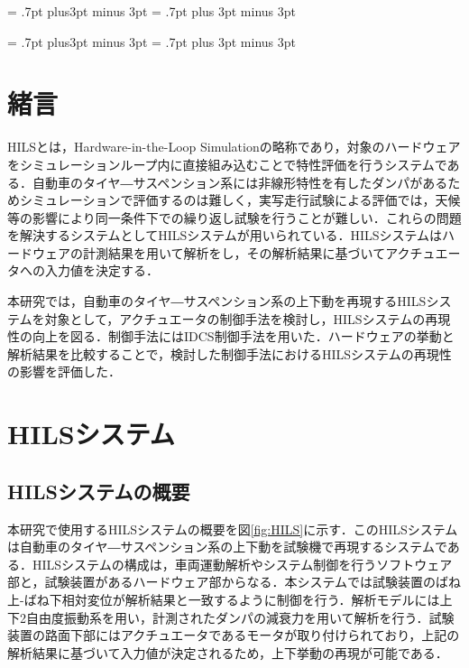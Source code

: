 \documentclass{article_vdlab_sotsuron_youshi}
\begin{document}
\kanjiskip = .7pt plus3pt minus 3pt
\xkanjiskip = .7pt plus 3pt minus 3pt
\small
{}

\setlength{\abovecaptionskip}{0mm}
\setlength{\belowcaptionskip}{0mm}
\setlength{\floatsep}{0mm}
\setlength{\textfloatsep}{0mm}
\setlength{\intextsep}{3mm}
\setlength{\dblfloatsep}{0mm}
\setlength{\dbltextfloatsep}{0mm}



\kanjiskip = .7pt plus3pt minus 3pt
\xkanjiskip = .7pt plus 3pt minus 3pt
\small
{}

\section{緒言}
HILSとは，Hardware-in-the-Loop Simulationの略称であり，対象のハードウェアをシミュレーションループ内に直接組み込むことで特性評価を行うシステムである．自動車のタイヤ―サスペンション系には非線形特性を有したダンパがあるためシミュレーションで評価するのは難しく，実写走行試験による評価では，天候等の影響により同一条件下での繰り返し試験を行うことが難しい．これらの問題を解決するシステムとしてHILSシステムが用いられている\cite{hils}．HILSシステムはハードウェアの計測結果を用いて解析をし，その解析結果に基づいてアクチュエータへの入力値を決定する．

本研究では，自動車のタイヤ―サスペンション系の上下動を再現するHILSシステムを対象として，アクチュエータの制御手法を検討し，HILSシステムの再現性の向上を図る．制御手法にはIDCS制御手法を用いた．ハードウェアの挙動と解析結果を比較することで，検討した制御手法におけるHILSシステムの再現性の影響を評価した．

\vspace{4mm}
\section{HILSシステム}
\subsection{HILSシステムの概要}
本研究で使用するHILSシステムの概要を図\ref{fig:HILS}に示す．このHILSシステムは自動車のタイヤ―サスペンション系の上下動を試験機で再現するシステムである．HILSシステムの構成は，車両運動解析やシステム制御を行うソフトウェア部と，試験装置があるハードウェア部からなる．本システムでは試験装置のばね上-ばね下相対変位が解析結果と一致するように制御を行う．解析モデルには上下2自由度振動系を用い，計測されたダンパの減衰力を用いて解析を行う．試験装置の路面下部にはアクチュエータであるモータが取り付けられており，上記の解析結果に基づいて入力値が決定されるため，上下挙動の再現が可能である．
\end{document}
